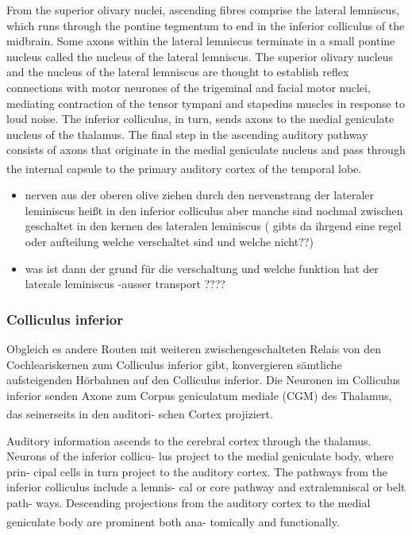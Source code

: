 \documentclass[12pt,a4paper,pdftex]{article}
\begin{document}
From the superior olivary nuclei, ascending fibres comprise
the lateral lemniscus, which runs through the pontine
tegmentum to end in the inferior colliculus of the
midbrain. Some axons within the lateral lemniscus terminate
in a small pontine nucleus called the nucleus of the lateral
lemniscus. The superior olivary nucleus and the nucleus of
the lateral lemniscus are thought to establish reflex
connections with motor neurones of the trigeminal and facial
motor nuclei, mediating contraction of the tensor tympani
and stapedius muscles in response to loud noise. The inferior
colliculus, in turn, sends axons to the medial geniculate
nucleus of the thalamus. The final step in the ascending
auditory pathway consists of axons that originate in the
medial geniculate nucleus and pass through the internal
capsule to the primary auditory cortex of the temporal
lobe.\textsuperscript{\cite[10]{crossman2014neuroanatomy}}

    \begin{itemize}
        \item nerven aus der oberen olive ziehen durch den nervenstrang der lateraler leminiscus heißt in den inferior colliculus aber manche sind nochmal zwischen geschaltet in den kernen des lateralen leminiscus ( gibts da ihrgend eine regel oder aufteilung welche verschaltet sind und welche nicht??)
        \item was ist dann der grund für die verschaltung und welche funktion hat der laterale leminiscus -ausser transport ????
    \end{itemize}


\subsubsection*{Colliculus inferior}

Obgleich es andere Routen mit weiteren zwischengeschalteten Relais von
den Cochleariskernen zum Colliculus inferior gibt, konvergieren sämtliche aufsteigenden
Hörbahnen auf den Colliculus inferior. Die Neuronen im Colliculus inferior senden Axone
zum Corpus geniculatum mediale (CGM) des Thalamus, das seinerseits in den auditori-
schen Cortex projiziert. \textsuperscript{\cite[11]{neurowissenschaften_baer}}

Auditory information ascends to the cerebral cortex
through the thalamus. Neurons of the inferior collicu-
lus project to the medial geniculate body, where prin-
cipal cells in turn project to the auditory cortex. The
pathways from the inferior colliculus include a lemnis-
cal or core pathway and extralemniscal or belt path-
ways. Descending projections from the auditory cortex
to the medial geniculate body are prominent both ana-
tomically and functionally. \textsuperscript{\cite[31]{kandel2013principles}}
\end{document}
